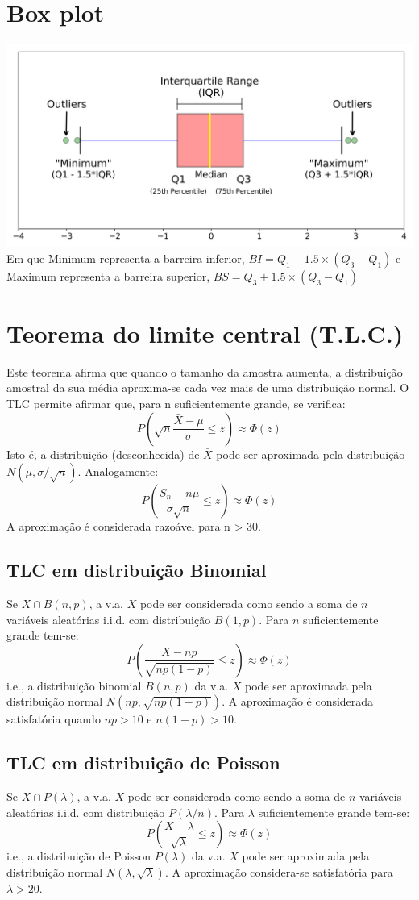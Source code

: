 \documentclass[10pt,a4paper]{report}
\begin{document}
\section{Box plot}
\includegraphics[scale=0.1]{1_2c21SkzJMf3frPXPAR_gZA}
Em que Minimum representa a barreira inferior, $ BI = Q_1 - 1.5 \times (Q_3 - Q_1
)$ e Maximum representa a barreira superior,  $BS = Q_3 + 1.5 \times (Q_3 - Q_1
)$

\section{Teorema do limite central (T.L.C.)}
Este teorema afirma que quando o tamanho da amostra aumenta, a distribuição amostral da sua média aproxima-se cada vez mais de uma distribuição normal. O TLC permite afirmar que, para n suficientemente grande, se
verifica:
$$
P\left(\sqrt{n}\frac{\bar{X}-\mu}{\sigma}\leq z\right)\approx \Phi(z)
$$
Isto é, a distribuição (desconhecida) de $\bar{X}$ pode ser aproximada
pela distribuição $N(\mu, \sigma/\sqrt{n})$.
Analogamente:
$$
P\left(\frac{S_n-n\mu}{\sigma\sqrt{n}}\leq z\right)\approx \Phi(z)
$$
A aproximaç\~ao é considerada razoável para
n > 30.

\subsection{TLC em distribuiç\~ao Binomial}
Se $X \cap B(n, p)$, a v.a. $X$ pode ser considerada como sendo a
soma de $n$ variáveis aleatórias i.i.d. com distribuição $B(1, p)$. Para $n$ suficientemente grande tem-se:
$$
P\left(\frac{X-np}{\sqrt{np(1-p)}}\leq z\right) \approx \Phi(z)
$$
i.e., a distribuição binomial $B(n, p)$ da v.a. $X$ pode ser
aproximada pela distribuição normal $N(np,
\sqrt{np(1 - p)})$.
A aproximação é considerada satisfatória
quando $np > 10$ e $n(1 - p) > 10$.

\subsection{TLC em distribuiç\~ao de Poisson}
Se $X \cap P(\lambda)$, a v.a. $X$ pode ser considerada como sendo a
soma de $n$ variáveis aleatórias i.i.d. com distribuição $P(\lambda/n)$. 
Para $\lambda$ suficientemente grande tem-se:
$$
P\left(\frac{X-\lambda}{\sqrt{\lambda}} \leq z \right) \approx \Phi(z)
$$
i.e., a distribuição de Poisson $P(\lambda)$ da v.a. $X$ pode ser
aproximada pela distribuição normal $N(\lambda, \sqrt{\lambda})$.
A aproximação considera-se satisfatória para
$\lambda > 20$.
\end{document}
